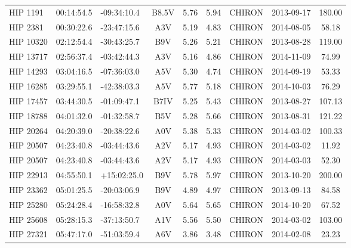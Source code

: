 \begin{scriptsize}
\begin{longtable}{lllcccrcc}
   HIP 1191 &  00:14:54.5 &  -09:34:10.4 &          B8.5V &     5.76 &     5.94 &     CHIRON &  2013-09-17 &          180.00 \\
    HIP 2381 &  00:30:22.6 &  -23:47:15.6 &            A3V &     5.19 &     4.83 &     CHIRON &  2014-08-05 &           58.18 \\
   HIP 10320 &  02:12:54.4 &  -30:43:25.7 &            B9V &     5.26 &     5.21 &     CHIRON &  2013-08-28 &          119.00 \\
   HIP 13717 &  02:56:37.4 &  -03:42:44.3 &            A3V &     5.16 &     4.86 &     CHIRON &  2014-11-09 &           74.99 \\
   HIP 14293 &  03:04:16.5 &  -07:36:03.0 &            A5V &     5.30 &     4.74 &     CHIRON &  2014-09-19 &           53.33 \\
   HIP 16285 &  03:29:55.1 &  -42:38:03.3 &            A5V &     5.77 &     5.18 &     CHIRON &  2014-10-03 &           76.29 \\
   HIP 17457 &  03:44:30.5 &  -01:09:47.1 &           B7IV &     5.25 &     5.43 &     CHIRON &  2013-08-27 &          107.13 \\
   HIP 18788 &  04:01:32.0 &  -01:32:58.7 &            B5V &     5.28 &     5.66 &     CHIRON &  2013-08-31 &          121.22 \\
   HIP 20264 &  04:20:39.0 &  -20:38:22.6 &            A0V &     5.38 &     5.33 &     CHIRON &  2014-03-02 &          100.33 \\
   HIP 20507 &  04:23:40.8 &  -03:44:43.6 &            A2V &     5.17 &     4.93 &     CHIRON &  2014-03-02 &           11.92 \\
   HIP 20507 &  04:23:40.8 &  -03:44:43.6 &            A2V &     5.17 &     4.93 &     CHIRON &  2014-03-03 &           52.30 \\
   HIP 22913 &  04:55:50.1 &  +15:02:25.0 &            B9V &     5.78 &     5.97 &     CHIRON &  2013-10-20 &          200.00 \\
   HIP 23362 &  05:01:25.5 &  -20:03:06.9 &            B9V &     4.89 &     4.97 &     CHIRON &  2013-09-13 &           84.58 \\
   HIP 25280 &  05:24:28.4 &  -16:58:32.8 &            A0V &     5.64 &     5.65 &     CHIRON &  2014-10-20 &           67.52 \\
   HIP 25608 &  05:28:15.3 &  -37:13:50.7 &            A1V &     5.56 &     5.50 &     CHIRON &  2014-03-02 &          103.00 \\
   HIP 27321 &  05:47:17.0 &  -51:03:59.4 &            A6V &     3.86 &     3.48 &     CHIRON &  2014-02-08 &           23.23 \\

\end{longtable}
\end{scriptsize}
